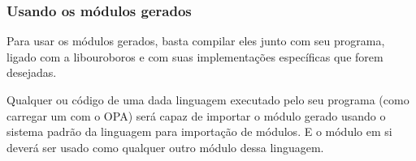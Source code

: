 \subsubsection{Usando os módulos gerados}
Para usar os módulos gerados, basta compilar eles junto com seu programa, ligado com
a libouroboros e com suas implementações específicas que forem desejadas.

Qualquer \script{} ou código de uma dada linguagem executado pelo seu programa (como 
carregar um \script{} com o OPA) será capaz de importar o módulo gerado usando o
sistema padrão da linguagem para importação de módulos. E o módulo em si deverá ser
usado como qualquer outro módulo dessa linguagem.
